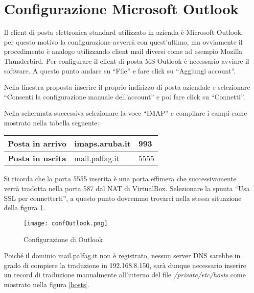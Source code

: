\section{Configurazione Microsoft Outlook}
Il client di posta elettronica standard utilizzato in azienda è Microsoft Outlook, 
per questo motivo la configurazione avverrà con quest'ultimo, 
ma ovviamente il procedimento è analogo utilizzando client mail diversi come ad esempio Mozilla Thunderbird.
Per configurare il client di posta MS Outlook è necessario avviare il software.
A questo punto andare su ``File'' e fare click su ``Aggiungi account''.

Nella finestra proposta inserire il proprio indirizzo di posta aziendale e selezionare ``Consenti la configurazione
manuale dell'account'' e poi fare click su ``Connetti''.

Nella schermata successiva selezionare la voce ``IMAP'' e compilare i campi come mostrato nella tabella seguente:


\begin{table}[htp]
    \centering
    \begin{tabular}{|l|l|l|}
    \hline
    \rowcolor[HTML]{EFEFEF} 
    \textbf{Posta in arrivo} & imaps.aruba.it & 993  \\ \hline
    \textbf{Posta in uscita} & mail.palfag.it & 5555 \\ \hline
    \end{tabular}%
    \end{table}

    Si ricorda che la porta 5555 inserita è una porta effimera che successivamente verrà tradotta nella porta 587
    dal NAT di VirtualBox.
    Selezionare la spunta ``Usa SSL per connetterti'', a questo punto dovremmo trovarci nella stessa situazione
    della figura \ref{confOutlook}.

        \begin{figure}[htp]
            \centering
            \texttt{[image: confOutlook.png]}
            \caption{Configurazione di Outlook}\label{confOutlook}
        \end{figure}        
    

    Poiché il dominio mail.palfag.it non è registrato, 
    nessun server DNS sarebbe in grado di compiere la traduzione in 192.168.8.150, 
    sarà dunque necessario inserire un record di traduzione manualmente all’interno del file \textit{/private/etc/hosts} 
    come mostrato nella figura \ref{hosts}.

